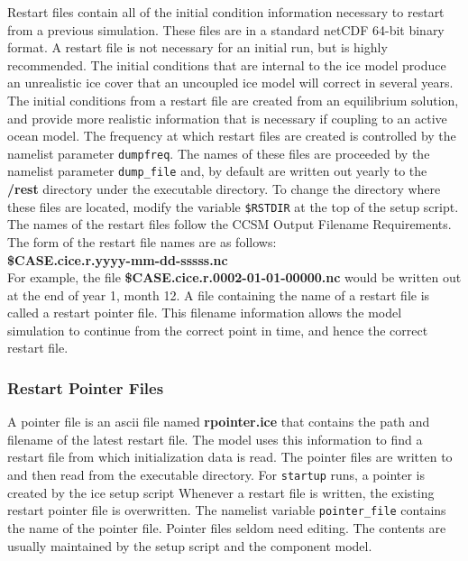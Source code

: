 
Restart files contain all of the initial condition information
necessary to restart from a previous simulation.  These files are in a
standard netCDF 64-bit binary format. A restart file is not necessary for
an initial run, but is highly recommended.  The initial conditions
that are internal to the ice model produce an unrealistic ice cover
that an uncoupled ice model will correct in several years.  The initial
conditions from a restart file are created from an equilibrium solution,
and provide more realistic information that is necessary if coupling
to an active ocean model.  The frequency at which restart files are created
is controlled by the namelist parameter {\tt dumpfreq}. 
The names of these files are proceeded by the namelist parameter 
{\tt dump\_file} and, by default are written out yearly to the {\bf /rest}
directory under the executable directory.  To change the directory where these files are
located, modify the variable {\tt \$RSTDIR} at the top of the setup script.
The names of the restart files follow the CCSM Output Filename Requirements.
The form of the restart file names are as follows: \\

{\bf \$CASE.cice.r.yyyy-mm-dd-sssss.nc} \\

For example, the file {\bf \$CASE.cice.r.0002-01-01-00000.nc} would be written
out at the end of year 1, month 12.  A file containing the name of a restart
file is called a restart pointer file. This filename information allows the
model simulation to continue from the correct point in time, and hence the
correct restart file.

\subsubsection*{Restart Pointer Files}
\label{pointer_files}

A pointer file is an ascii file named {\bf rpointer.ice} that contains the
path and filename of the latest restart file. The model uses this information to find
a restart file from which initialization data is read.  The pointer files are
written to and then read from the executable directory. For 
{\tt startup} runs, a pointer is created by the ice setup script 
Whenever a restart file is written, the existing restart pointer file 
is overwritten.  The namelist variable {\tt pointer\_file} contains the
name of the pointer file. Pointer files seldom need editing.  The contents
are usually maintained by the setup script and the component model. 

